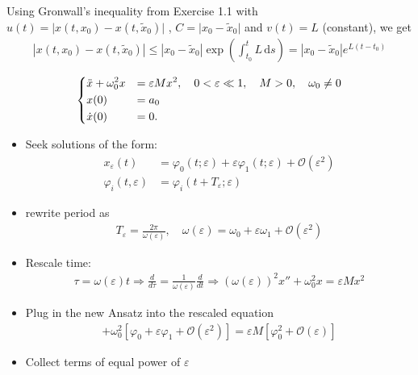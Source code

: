 \begin{solution}[2.1]
\begin{enumerate}
Using Gronwall's inequality from Exercise 1.1 with
$u(t) = \vert x(t,x_0) - x(t,\tilde{x}_0) \vert$ , $C = \vert x_0 - \tilde{x}_0 \vert$ and $v(t) = L$ (constant), we get
\begin{align}
	\left\vert x(t,x_0) - x(t,\tilde{x}_0) \right\vert \leq \left\vert x_0 - \tilde{x}_0 \right\vert \exp \left( \int_{t_0}^t L\,\text{d}s \right) = \left\vert x_0 - \tilde{x}_0 \right\vert e^{L(t-t_0)}
\end{align}

\end{enumerate}
\end{solution}


\begin{solution}[2.3]
\begin{align}
	\begin{dcases}
	\ddot{x} + \omega_0^2 x &= \varepsilon Mx^2, \quad 0 < \varepsilon \ll 1, \quad M>0, \quad \omega_0 \neq 0 \\
	x(0) &= a_0 \\
	\dot{x}(0) &= 0.
	\end{dcases}
\end{align}
\begin{itemize}
	\item Seek solutions of the form:
		\begin{align}
			x_\varepsilon(t) &= \varphi_0(t;\varepsilon) + \varepsilon\varphi_1(t;\varepsilon) + \mathcal{O}(\varepsilon^2) \\
			\varphi_i (t, \varepsilon) &= \varphi_i(t + T_\varepsilon; \varepsilon)
		\end{align}
	\item rewrite period as
		\begin{align}
			T_\varepsilon = \frac{2\pi}{\omega(\varepsilon)}, \quad \omega(\varepsilon) = \omega_0 + \varepsilon \omega_1 + \mathcal{O}(\varepsilon^2)
		\end{align}
	\item Rescale time: 
		\begin{align}
			\tau = \omega(\varepsilon)t \Longrightarrow \boxed{\frac{d}{d\tau} = \frac{1}{\omega(\varepsilon)}\frac{d}{dt}} \Longrightarrow \boxed{\left(\omega(\varepsilon)\right)^2x''+\omega_0^2 x = \varepsilon M x^2}
		\end{align}
	\item Plug in the new Ansatz into the rescaled equation
		\begin{align}
			[\omega_0^2 + 2\varepsilon \omega_0 \omega_1 + \mathcal{O}(\varepsilon^2)][\varphi_0'' + \varepsilon \varphi_1''+ \mathcal{O}(\varepsilon^2)] + \omega_0^2[\varphi_0 + \varepsilon \varphi_1+ \mathcal{O}(\varepsilon^2)] = \varepsilon M [\varphi_0^2 + \mathcal{O}(\varepsilon)]
		\end{align}
	\item Collect terms of equal power of $\varepsilon$
	

\end{itemize}
\end{solution}
